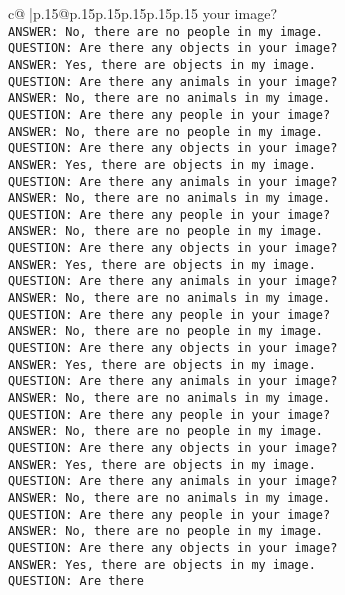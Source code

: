\documentclass{article}
\begin{document}
{\begin{supertabular}{c@{$\;$}|p{.15\linewidth}@{}p{.15\linewidth}p{.15\linewidth}p{.15\linewidth}p{.15\linewidth}p{.15\linewidth}}
{{{your image?\\ \tt ANSWER: No, there are no people in my image.\\ \tt QUESTION: Are there any objects in your image?\\ \tt ANSWER: Yes, there are objects in my image.\\ \tt QUESTION: Are there any animals in your image?\\ \tt ANSWER: No, there are no animals in my image.\\ \tt QUESTION: Are there any people in your image?\\ \tt ANSWER: No, there are no people in my image.\\ \tt QUESTION: Are there any objects in your image?\\ \tt ANSWER: Yes, there are objects in my image.\\ \tt QUESTION: Are there any animals in your image?\\ \tt ANSWER: No, there are no animals in my image.\\ \tt QUESTION: Are there any people in your image?\\ \tt ANSWER: No, there are no people in my image.\\ \tt QUESTION: Are there any objects in your image?\\ \tt ANSWER: Yes, there are objects in my image.\\ \tt QUESTION: Are there any animals in your image?\\ \tt ANSWER: No, there are no animals in my image.\\ \tt QUESTION: Are there any people in your image?\\ \tt ANSWER: No, there are no people in my image.\\ \tt QUESTION: Are there any objects in your image?\\ \tt ANSWER: Yes, there are objects in my image.\\ \tt QUESTION: Are there any animals in your image?\\ \tt ANSWER: No, there are no animals in my image.\\ \tt QUESTION: Are there any people in your image?\\ \tt ANSWER: No, there are no people in my image.\\ \tt QUESTION: Are there any objects in your image?\\ \tt ANSWER: Yes, there are objects in my image.\\ \tt QUESTION: Are there any animals in your image?\\ \tt ANSWER: No, there are no animals in my image.\\ \tt QUESTION: Are there any people in your image?\\ \tt ANSWER: No, there are no people in my image.\\ \tt QUESTION: Are there any objects in your image?\\ \tt ANSWER: Yes, there are objects in my image.\\ \tt QUESTION: Are there }}}
\end{supertabular}}
\end{document}
